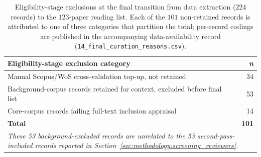 \begin{table}[H]
\centering
\caption{Eligibility-stage exclusions at the final transition from data
extraction ($224$ records) to the $123$-paper reading list. Each of the $101$
non-retained records is attributed to one of three categories that partition
the total; per-record codings are published in the accompanying data-availability
record (\texttt{14\_final\_curation\_reasons.csv}).}
\label{tab:final_exclusions}
\small
\setlength{\tabcolsep}{4pt}
\begin{tabular}{lr}
\toprule
\textbf{Eligibility-stage exclusion category} & \textbf{\textit{n}} \\
\midrule
Manual Scopus/WoS cross-validation top-up, not retained & 34 \\
Background-corpus records retained for context, excluded before final list & 53 \\
Core-corpus records failing full-text inclusion appraisal & 14 \\
\midrule
\textbf{Total} & \textbf{101} \\
\bottomrule
\multicolumn{2}{p{0.95\linewidth}}{\footnotesize\emph{These 53
background-excluded records are unrelated to the 53 second-pass-included
records reported in Section~\ref{sec:methodology:screening_reviewers}.}} \\
\end{tabular}
\end{table}

